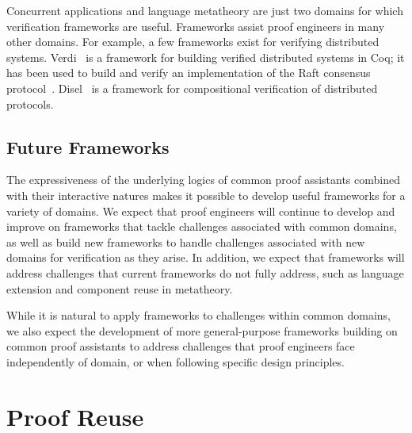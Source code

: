 Concurrent applications and language metatheory are just two domains for which
verification frameworks are useful. Frameworks assist proof engineers in many other domains.
For example, a few frameworks exist for verifying distributed systems.
Verdi~\citep{Wilcox2015} is a framework for building verified distributed systems in Coq; %
it has been used to build and verify an implementation of the Raft consensus protocol~\citep{Woos2016}.
Disel~\citep{Sergey2017} is a framework for compositional verification of distributed protocols.




\subsection{Future Frameworks}
\label{sec:futureframe}

The expressiveness of the underlying logics of common proof assistants combined with their interactive natures
makes it possible to develop useful frameworks for a variety of domains. We expect that proof engineers
will continue to develop and improve on frameworks that tackle challenges associated with common domains,
as well as build new frameworks to handle challenges associated with new domains for verification as they arise.
In addition, we expect that frameworks will address challenges that current frameworks do not fully address,
such as language extension and component reuse in metatheory. %

While it is natural to apply frameworks to challenges within common domains, we also expect the development of
more general-purpose frameworks building on common proof assistants to address challenges that proof engineers
face independently of domain, or when following specific design principles.

\section{Proof Reuse}
\label{sec:proof-reuse}

